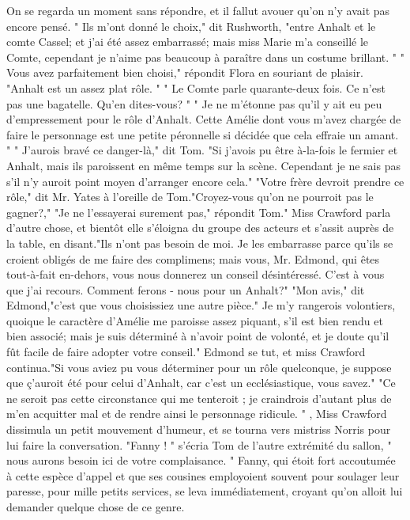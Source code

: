 On se regarda un moment sans répondre, et il fallut avouer qu'on n'y avait pas encore pensé.
" Ils m'ont donné le choix," dit Rushworth, "entre Anhalt et le comte Cassel; et j'ai été assez embarrassé; mais miss Marie m'a conseillé le Comte, cependant je n'aime pas beaucoup à paraître dans un costume brillant. "
" Vous avez parfaitement bien choisi," répondit Flora en souriant de plaisir. "Anhalt est un assez plat rôle. "
" Le Comte parle quarante-deux fois. Ce n'est pas une bagatelle. Qu'en dites-vous? "
" Je ne m'étonne pas qu'il y ait eu peu d'empressement pour le rôle d'Anhalt. Cette Amélie dont vous m'avez chargée de faire le personnage est une petite péronnelle si décidée que cela effraie un amant. "
" J'aurois bravé ce danger-là," dit Tom. "Si j'avois pu être à-la-fois le fermier et Anhalt, mais ils paroissent en même temps sur la scène. Cependant je ne sais pas s'il\setcounter{page}{114} n'y auroit point moyen d'arranger encore cela."
"Votre frère devroit prendre ce rôle," dit Mr. Yates à l'oreille de Tom."Croyez-vous qu'on ne pourroit pas le gagner?,"
"Je ne l'essayerai surement pas," répondit Tom." Miss Crawford parla d'autre chose, et bientôt elle s'éloigna du groupe des acteurs et s'assit auprès de la table, en disant."Ils n'ont pas besoin de moi. Je les embarrasse parce qu'ils se croient obligés de me faire des complimens; mais vous, Mr. Edmond, qui êtes tout-à-fait en-dehors, vous nous donnerez un conseil désintéressé. C'est à vous que j'ai recours. Comment ferons - nous pour un Anhalt?"
"Mon avis," dit Edmond,"c'est que vous choisissiez une autre pièce."
Je m'y rangerois volontiers, quoique le caractère d'Amélie me paroisse assez piquant, s'il est bien rendu et bien associé; mais je suis déterminé à n'avoir point de volonté, et je doute qu'il fût facile de faire adopter votre conseil."
Edmond se tut, et miss Crawford continua."Si vous aviez pu vous déterminer pour un rôle quelconque, je suppose que ç'auroit\setcounter{page}{115} été pour celui d'Anhalt, car c'est un ecclésiastique, vous savez."
"Ce ne seroit pas cette circonstance qui me tenteroit ; je craindrois d'autant plus de m'en acquitter mal et de rendre ainsi le personnage ridicule. "
, Miss Crawford dissimula un petit mouvement d'humeur, et se tourna vers mistriss Norris pour lui faire la conversation.
"Fanny ! " s'écria Tom de l'autre extrémité du sallon, " nous aurons besoin ici de votre complaisance. "
Fanny, qui étoit fort accoutumée à cette espèce d'appel et que ses cousines employoient souvent pour soulager leur paresse, pour mille petits services, se leva immédiatement, croyant qu'on alloit lui demander quelque chose de ce genre.
